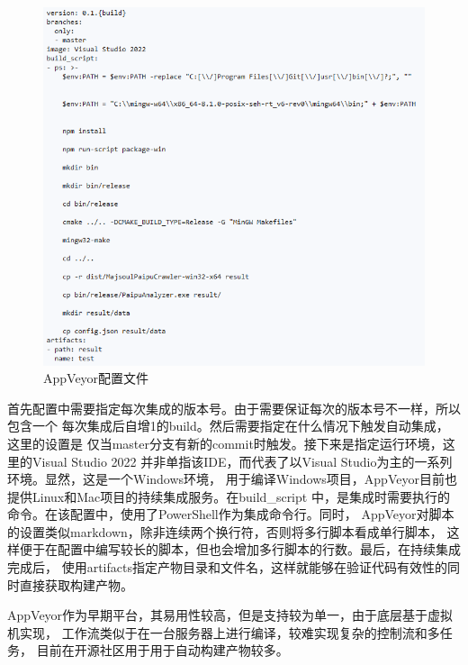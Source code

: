 \begin{figure}[h]
    \centering
    \includegraphics[width=1\textwidth]{figures/appveyor/config.png}
    \caption{AppVeyor配置文件}
    \label{fig:my_label}
\end{figure}

首先配置中需要指定每次集成的版本号。由于需要保证每次的版本号不一样，所以包含一个
每次集成后自增1的build。然后需要指定在什么情况下触发自动集成，这里的设置是
仅当master分支有新的commit时触发。接下来是指定运行环境，这里的Visual Studio 2022
并非单指该IDE，而代表了以Visual Studio为主的一系列环境。显然，这是一个Windows环境，
用于编译Windows项目，AppVeyor目前也提供Linux和Mac项目的持续集成服务。在build\_script
中，是集成时需要执行的命令。在该配置中，使用了PowerShell作为集成命令行。同时，
AppVeyor对脚本的设置类似markdown，除非连续两个换行符，否则将多行脚本看成单行脚本，
这样便于在配置中编写较长的脚本，但也会增加多行脚本的行数。最后，在持续集成完成后，
使用artifacts指定产物目录和文件名，这样就能够在验证代码有效性的同时直接获取构建产物。

AppVeyor作为早期平台，其易用性较高，但是支持较为单一，由于底层基于虚拟机实现，
工作流类似于在一台服务器上进行编译，较难实现复杂的控制流和多任务，
目前在开源社区用于用于自动构建产物较多。